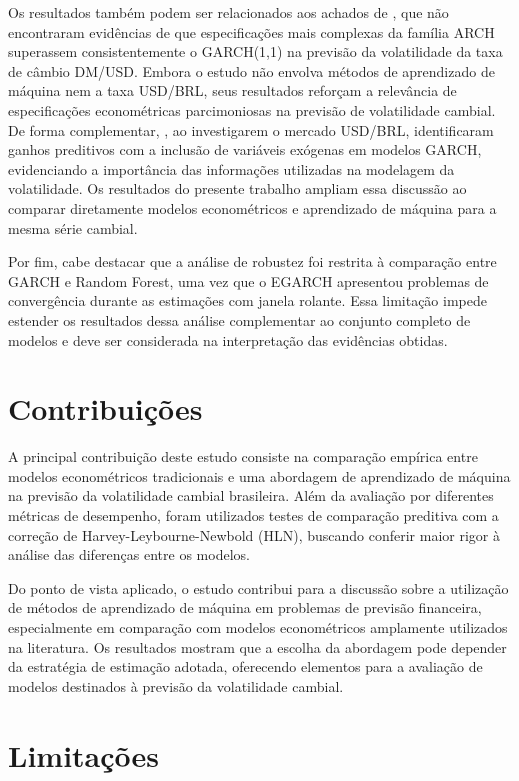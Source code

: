Os resultados também podem ser relacionados aos achados de \textcite{hansen2005forecast}, que não encontraram evidências de que especificações 
mais complexas da família ARCH superassem consistentemente o GARCH(1,1) na previsão da volatilidade da taxa de câmbio DM/USD. Embora o 
estudo não envolva métodos de aprendizado de máquina nem a taxa USD/BRL, seus resultados reforçam a relevância de especificações 
econométricas parcimoniosas na previsão de volatilidade cambial. De forma complementar, \textcite{campani2018forecasting}, ao investigarem o mercado 
USD/BRL, identificaram ganhos preditivos com a inclusão de variáveis exógenas em modelos GARCH, evidenciando a importância das informações 
utilizadas na modelagem da volatilidade. Os resultados do presente trabalho ampliam essa discussão ao comparar diretamente modelos 
econométricos e aprendizado de máquina para a mesma série cambial.

Por fim, cabe destacar que a análise de robustez foi restrita à comparação entre GARCH e Random Forest, uma vez que o EGARCH apresentou 
problemas de convergência durante as estimações com janela rolante. Essa limitação impede estender os resultados dessa análise complementar 
ao conjunto completo de modelos e deve ser considerada na interpretação das evidências obtidas.

\section{Contribuições}

A principal contribuição deste estudo consiste na comparação empírica entre modelos econométricos tradicionais e uma abordagem 
de aprendizado de máquina na previsão da volatilidade cambial brasileira. Além da avaliação por diferentes métricas de desempenho, 
foram utilizados testes de comparação preditiva com a correção de Harvey-Leybourne-Newbold (HLN), buscando conferir maior rigor à 
análise das diferenças entre os modelos.

Do ponto de vista aplicado, o estudo contribui para a discussão sobre a utilização de métodos de aprendizado de máquina em problemas 
de previsão financeira, especialmente em comparação com modelos econométricos amplamente utilizados na literatura. Os resultados mostram 
que a escolha da abordagem pode depender da estratégia de estimação adotada, oferecendo elementos para a avaliação de modelos destinados à 
previsão da volatilidade cambial.

\section{Limitações}

